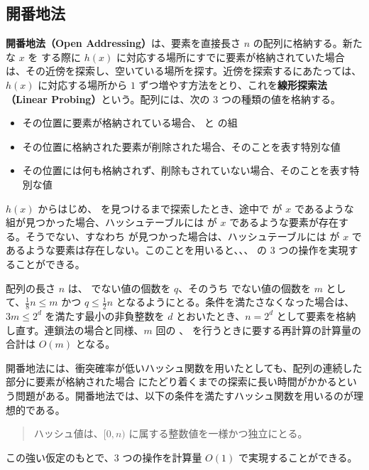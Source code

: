\documentclass[dvipdfmx,a4j,10pt]{jarticle}
\begin{document}
\subsection{開番地法}
\label{開番地法}

\textbf{開番地法（Open Addressing）}\cite{データ構造}は、要素を直接長さ $n$ の配列に格納する。新たな  $x$ を  する際に $h(x)$ に対応する場所にすでに要素が格納されていた場合は、その近傍を探索し、空いている場所を探す。近傍を探索するにあたっては、$h(x)$ に対応する場所から $1$ ずつ増やす方法をとり、これを\textbf{線形探索法（Linear Probing）}という。配列には、次の $3$ つの種類の値を格納する。

\begin{itemize}
  \item その位置に要素が格納されている場合、 と  の組
  \item その位置に格納された要素が削除された場合、そのことを表す特別な値 
  \item その位置には何も格納されず、削除もされていない場合、そのことを表す特別な値 
\end{itemize}

$h(x)$ からはじめ、 を見つけるまで探索したとき、途中で  が $x$ であるような組が見つかった場合、ハッシュテーブルには  が $x$ であるような要素が存在する。そうでない、すなわち  が見つかった場合は、ハッシュテーブルには  が $x$ であるような要素は存在しない。このことを用いると、、、 の $3$ つの操作を実現することができる。

配列の長さ $n$ は、 でない値の個数を $q$、そのうち  でない値の個数を $m$ として、$\displaystyle \frac{1}{8} n \leq m$ かつ $\displaystyle q \leq \frac{1}{2} n$ となるようにとる。条件を満たさなくなった場合は、$3m \leq 2^d$ を満たす最小の非負整数を $d$ とおいたとき、$n = 2^d$ として要素を格納し直す。連鎖法の場合と同様、$m$ 回の 、 を行うときに要する再計算の計算量の合計は $O(m)$ となる。

開番地法には、衝突確率が低いハッシュ関数を用いたとしても、配列の連続した部分に要素が格納された場合  にたどり着くまでの探索に長い時間がかかるという問題がある。開番地法では、以下の条件を満たすハッシュ関数を用いるのが理想的である。
\begin{quotation}
\noindent ハッシュ値は、$[0, n)$ に属する整数値を一様かつ独立にとる。
\end{quotation}
この強い仮定のもとで、$3$ つの操作を計算量 $O(1)$ で実現することができる。
\end{document}
